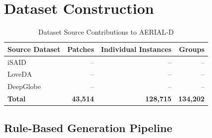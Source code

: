 \section{Dataset Construction}

\begin{table}[H]
\centering
\caption{Dataset Source Contributions to AERIAL-D}
\label{tab:dataset_sources}
\begin{tabular}{@{}lrrr@{}}
\toprule
\textbf{Source Dataset} & \textbf{Patches} & \textbf{Individual Instances} & \textbf{Groups} \\
\midrule
iSAID & -- & -- & -- \\
LoveDA & -- & -- & -- \\
DeepGlobe & -- & -- & -- \\
\midrule
\textbf{Total} & \textbf{43,514} & \textbf{128,715} & \textbf{134,202} \\
\bottomrule
\end{tabular}
\end{table}

\subsection{Rule-Based Generation Pipeline}

